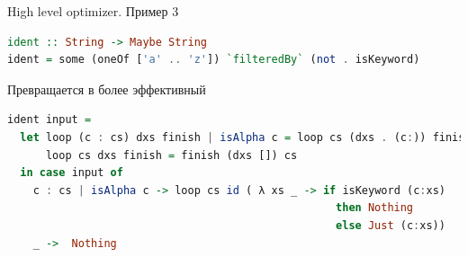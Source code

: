 



\begin{frame}[fragile]{High level optimizer. Пример 3}
\begin{lstlisting}[language=haskell]
ident :: String -> Maybe String
ident = some (oneOf ['a' .. 'z']) `filteredBy` (not . isKeyword)
\end{lstlisting}
Превращается в более эффективный
\begin{lstlisting}[language=haskell]
ident input =
  let loop (c : cs) dxs finish | isAlpha c = loop cs (dxs . (c:)) finish
      loop cs dxs finish = finish (dxs []) cs
  in case input of
    c : cs | isAlpha c -> loop cs id ( λ xs _ -> if isKeyword (c:xs)
                                                   then Nothing 
                                                   else Just (c:xs))
    _ ->  Nothing
\end{lstlisting}
\end{frame}









